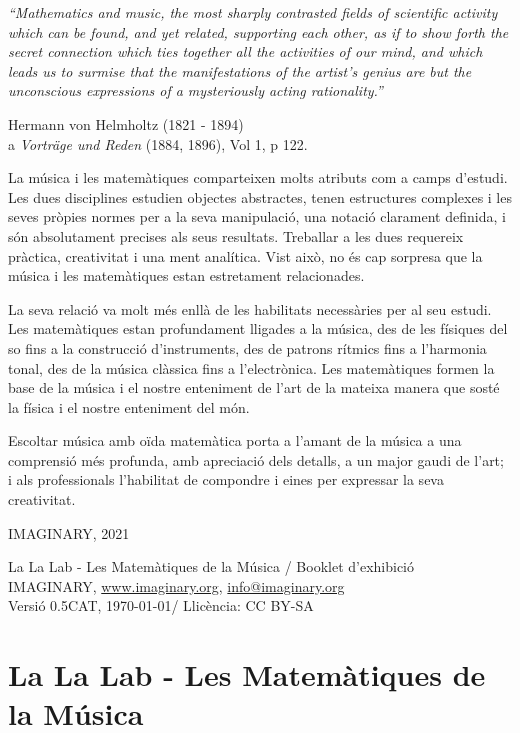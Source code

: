 \epigraph{ \itshape ``Mathematics and music, the most sharply contrasted fields of scientific activity which can be found, and yet related, supporting each other, as if to show forth the secret connection which ties together all the activities of our mind, and which leads us to surmise that the  manifestations of the artist's genius are but the unconscious expressions of a mysteriously acting rationality.''
}
{\vspace{0.5em}Hermann von Helmholtz (1821 - 1894) \\
a \textit{Vorträge und Reden} (1884, 1896), Vol 1, p 122.}

La música i les matemàtiques comparteixen molts atributs com a camps d'estudi. Les dues disciplines estudien objectes abstractes, tenen estructures complexes i les seves pròpies normes per a la seva manipulació, una notació clarament definida, i són absolutament precises als seus resultats. Treballar a les dues requereix pràctica, creativitat i una ment analítica. Vist això, no és cap sorpresa que la música i les matemàtiques estan estretament relacionades.

La seva relació va molt més enllà de les habilitats necessàries per al seu estudi. Les matemàtiques estan profundament lligades a la música, des de les físiques del so fins a la construcció d'instruments, des de patrons rítmics fins a l'harmonia tonal, des de la música clàssica fins a l'electrònica. Les matemàtiques formen la base de la música i el nostre enteniment de l'art de la mateixa manera que sosté la física i el nostre enteniment del món.
 
Escoltar música amb oïda matemàtica porta a l'amant de la música a una comprensió més profunda, amb apreciació dels detalls, a un major gaudi de l'art; i als professionals l'habilitat de compondre i eines per  expressar la seva creativitat.

\begin{flushright}
IMAGINARY, 2021
\end{flushright}

\vfill
La La Lab - Les Matemàtiques de la Música / Booklet d'exhibició \\
IMAGINARY, \url{www.imaginary.org}, \href{mailto:info@imaginary.org}{info@imaginary.org} \\
Versió 0.5CAT, \today / Llicència: CC BY-SA


\section*{La La Lab - Les Matemàtiques de la Música}

